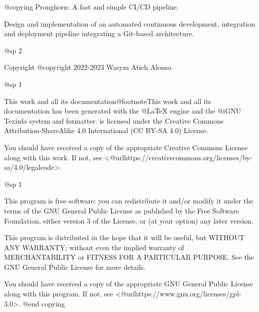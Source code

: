 @copying
Pronghorn: A fast and simple CI/CD pipeline.

Design and implementation of an automated continuous development, integration and deployment pipeline integrating a Git-based architecture.

@sp 2

Copyright @copyright{} 2022-2023 Wasym Atieh Alonso.

@sp 1

This work and all its documentation@footnote{This work and all its documentation has been generated with the @LaTeX{} engine and the @i{GNU Texinfo} system and formatter.} is licensed under the Creative Commons Attribution-ShareAlike 4.0 International (CC BY-SA 4.0) License.

You should have received a copy of the appropriate Creative Commons License along with this work. If not, see <@url{https://creativecommons.org/licenses/by-sa/4.0/legalcode}>.

@sp 1

This program is free software: you can redistribute it and/or modify it under the terms of the GNU General Public License as published by the Free Software Foundation, either version 3 of the License, or (at your option) any later version.

This program is distributed in the hope that it will be useful, but WITHOUT ANY WARRANTY; without even the implied warranty of MERCHANTABILITY or FITNESS FOR A PARTICULAR PURPOSE. See the GNU General Public License for more details.

You should have received a copy of the appropriate GNU General Public License along with this program. If not, see <@url{https://www.gnu.org/licenses/gpl-3.0}>.
@end copying
